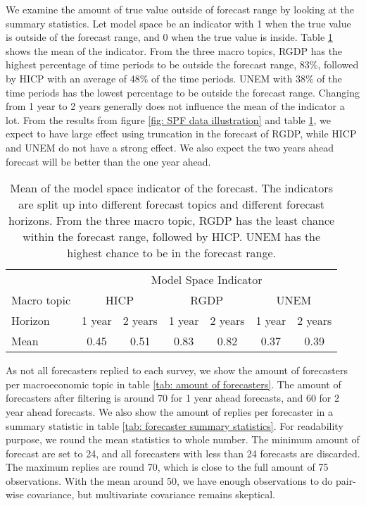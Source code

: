 \documentclass[11pt]{article}
\begin{document}
We examine the amount of true value outside of forecast range by
looking at the summary statistics. Let model space be an indicator with 1
when the true value is outside of the forecast range, and 0 when the
true value is inside. Table \ref{tab: modelspace summary statistics}
shows the mean of the indicator. From the three macro topics, RGDP has the highest percentage of time periods to be outside the forecast range, 83\%, followed by HICP
with an average of 48\% of the time periods. UNEM with 38\% of the time periods has the lowest percentage to be outside the forecast
range. Changing from 1 year to 2 years generally does not influence the
mean of the indicator a lot. From the results from figure
\ref{fig: SPF data illustration} and table
\ref{tab: modelspace summary statistics}, we expect to have large effect
using truncation in the forecast of RGDP, while HICP and UNEM do not
have a strong effect. We also expect the two years ahead forecast will
be better than the one year ahead.

\begin{table}[!h]
\centering
\caption{Mean of the model space indicator of the forecast. The indicators are split up into different forecast topics and different forecast horizons. From the three macro topic, RGDP has the least chance within the forecast range, followed by HICP. UNEM has the highest chance to be in the forecast range.}
\label{tab: modelspace summary statistics}
\begin{tabular}{lcccccc}
\hline
&\multicolumn{6}{c}{Model Space Indicator}\\
\cmidrule(lr){2-7}
Macro topic & \multicolumn{2}{c}{HICP} & \multicolumn{2}{c}{RGDP} & \multicolumn{2}{c}{UNEM} \\
\cmidrule(lr){2-3} \cmidrule(lr){4-5}\cmidrule(lr){6-7}
Horizon     & 1 year & 2 years & 1 year & 2 years & 1 year & 2 years \\ 
\hline
Mean        & 0.45        & 0.51         & 0.83        & 0.82        & 0.37         & 0.39       \\
\hline
\end{tabular}
\end{table}

As not all forecasters replied to each survey, we show the amount of forecasters per macroeconomic topic in table \ref{tab: amount of forecasters}. The amount of forecasters after filtering is around 70 for 1 year ahead forecasts, and 60 for 2 year ahead forecasts. We also show the amount of replies per forecaster in a summary statistic in table \ref{tab: forecaster summary statistics}. For readability purpose, we round the mean statistics to whole number. The minimum amount of forecast are set to 24, and all forecasters with less than 24 forecasts are discarded. The maximum replies are round 70, which is close to the full amount of 75 observations. With the mean around 50, we have enough observations to do pair-wise covariance, but multivariate covariance remains skeptical.
\end{document}
